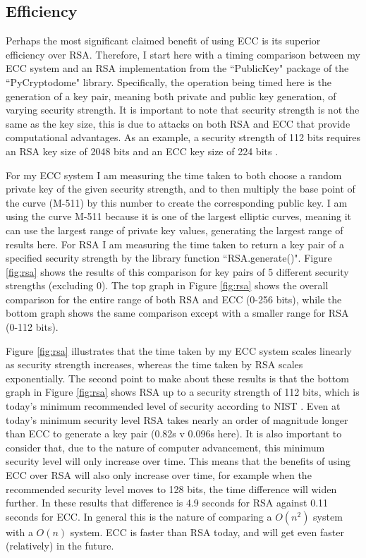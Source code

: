 \documentclass[12pt,a4paper]{article}
\begin{document}
\subsection{Efficiency} \noindent \label{Efficiency}
Perhaps the most significant claimed benefit of using ECC is its superior efficiency over RSA. 
Therefore, I start here with a timing comparison between my ECC system and an RSA implementation 
from the ``PublicKey" package of the ``PyCryptodome" library. 
Specifically, the operation being timed here is the generation of a key pair, meaning both private and public key generation, 
of varying security strength. 
It is important to note that security strength is not the same as the key size, this is due to attacks on both RSA and ECC that provide computational advantages. 
As an example, a security strength of 112 bits requires an RSA key size of 2048 bits and an ECC key size of 224 bits \cite[p54-55]{barker2020recommendation}. 

For my ECC system I am measuring the time taken to both choose a random private key of the given security strength, 
and to then multiply the base point of the curve (M-511) by this number to create the corresponding public key. 
I am using the curve M-511 because it is one of the largest elliptic curves, 
meaning it can use the largest range of private key values, generating the largest range of results here. 
For RSA I am measuring the time taken to return a key pair of a specified security strength by the library function ``RSA.generate()". 
Figure \ref{fig:rsa} shows the results of this comparison for key pairs of 5 different security strengths (excluding 0). 
The top graph in Figure \ref{fig:rsa} shows the overall comparison for the entire range of both RSA and ECC (0-256 bits), 
while the bottom graph shows the same comparison except with a smaller range for RSA (0-112 bits). 

Figure \ref{fig:rsa} illustrates that the time taken by my ECC system scales linearly as security strength increases, 
whereas the time taken by RSA scales exponentially. 
The second point to make about these results is that the bottom graph in Figure \ref{fig:rsa} shows RSA up to a security strength of 112 bits, 
which is today's minimum recommended level of security according to NIST \cite[p54-55]{barker2020recommendation}. 
Even at today's minimum security level RSA takes nearly an order of magnitude longer than ECC to generate a key pair (0.82s v 0.096s here). 
It is also important to consider that, due to the nature of computer advancement, this minimum security level will only increase over time. 
This means that the benefits of using ECC over RSA will also only increase over time, 
for example when the recommended security level moves to 128 bits, the time difference will widen further. 
In these results that difference is 4.9 seconds for RSA against 0.11 seconds for ECC. 
In general this is the nature of comparing a $O(n^2)$ system with a $O(n)$ system. 
ECC is faster than RSA today, and will get even faster (relatively) in the future. 
\end{document}

